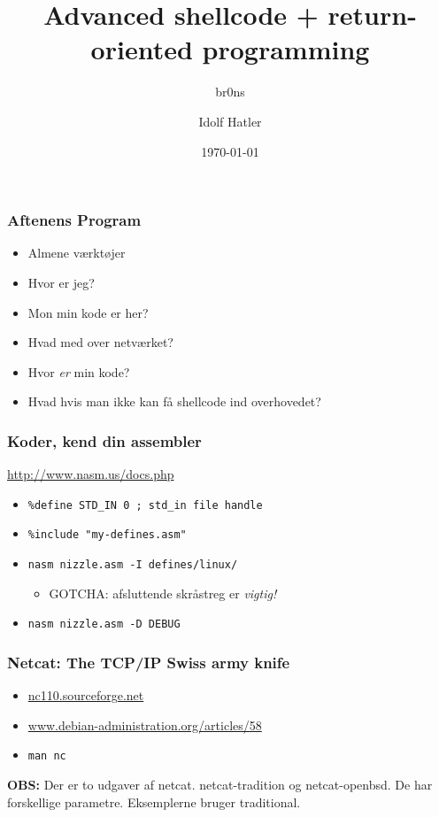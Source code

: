 \documentclass[slidestop,compress,mathserif, xcolor=table]{beamer}
\title[]{Advanced shellcode + return-oriented programming}
\author[br0ns \and Idolf Hatler]
       {br0ns \and Idolf Hatler}
\institute[DIKU]{Department of Computer Science}
\date[]{\today}
\begin{document}
\frame[plain]{\titlepage}

\begin{frame}[c]
    \frametitle{Aftenens Program}

    \begin{itemize}
        \item Almene værktøjer
        \item Hvor er jeg?
        \item Mon min kode er her?
        \item Hvad med over netværket?
        \item Hvor \emph{er} min kode?
        \item Hvad hvis man ikke kan få shellcode ind overhovedet?
    \end{itemize}
\end{frame}

\begin{frame}[c]
    \frametitle{Koder, kend din assembler}
    \url{http://www.nasm.us/docs.php} \\

    \begin{itemize}
        \pause\item \texttt{\%define STD\_IN 0 ; std\_in file handle}
        \pause\item \texttt{\%include "my-defines.asm"}
        \pause\item \texttt{nasm nizzle.asm -I defines/linux/}
        \pause
          \begin{itemize}
          \item GOTCHA: afsluttende skråstreg er \textit{vigtig!}
          \end{itemize}
        \pause\item \texttt{nasm nizzle.asm -D DEBUG}
        \pause
    \end{itemize}
\end{frame}

\begin{frame}[c]
    \frametitle{Netcat: The TCP/IP Swiss army knife}
    \begin{itemize}
      \item \url{nc110.sourceforge.net}
      \item \url{www.debian-administration.org/articles/58}
      \item \texttt{man nc}
    \end{itemize}

    \pause \textbf{OBS:} Der er to udgaver af netcat. netcat-tradition og
    netcat-openbsd. De har forskellige parametre. Eksemplerne bruger
    traditional.
\end{frame}
\end{document}
